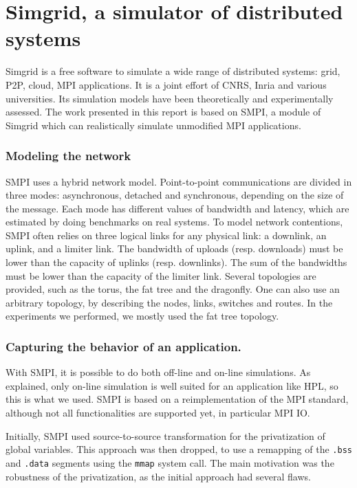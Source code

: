 \documentclass[12pt, a4paper]{memoir}
\begin{document}
\section{Simgrid, a simulator of distributed systems}
\label{sec:orgc53d7b7}
Simgrid is a free software to simulate a wide range of distributed systems: grid, P2P, cloud, MPI applications. It is
a joint effort of CNRS, Inria and various universities. Its simulation models have been theoretically and
experimentally assessed. The work presented in this report is based on SMPI\cite{degomme:hal-01415484}, a module of
Simgrid which can realistically simulate unmodified MPI applications.
\subsubsection{Modeling the network}
\label{sec:org39d8675}
SMPI uses a hybrid network model. Point-to-point communications are divided in three modes: asynchronous, detached
and synchronous, depending on the size of the message. Each mode has different values of bandwidth and latency,
which are estimated by doing benchmarks on real systems. To model network contentions, SMPI often relies on three logical
links for any physical link: a downlink, an uplink, and a limiter link.  The bandwidth of uploads
(resp. downloads) must be lower than the capacity of uplinks (resp. downlinks). The sum of the bandwidths must be
lower than the capacity of the limiter link. Several topologies are provided, such as the torus, the fat tree and
the dragonfly. One can also use an arbitrary topology, by describing the nodes, links, switches and routes. In the
experiments we performed, we mostly used the fat tree topology.
\subsubsection{Capturing the behavior of an application.}
\label{sec:org91d9a81}
With SMPI, it is possible to do both off-line and on-line simulations. As explained, only on-line simulation is well
suited for an application like HPL, so this is what we used. SMPI is based on a reimplementation of the MPI standard,
although not all functionalities are supported yet, in particular MPI IO.

Initially, SMPI used source-to-source transformation for the privatization of global variables. This approach was
then dropped, to use a remapping of the \texttt{.bss} and \texttt{.data} segments using the \texttt{mmap} system call. The main motivation was
the robustness of the privatization, as the initial approach had several flaws.
\end{document}
